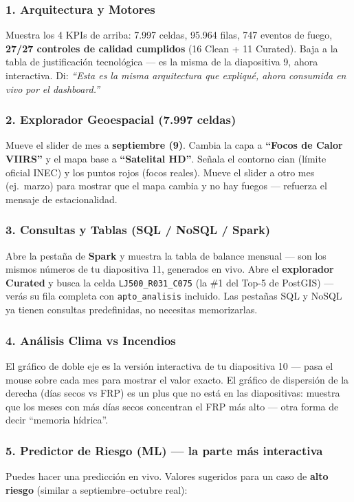 \documentclass[11pt,a4paper]{article}
\begin{document}
\subsubsection*{1. Arquitectura y Motores}
Muestra los 4 KPIs de arriba: 7.997 celdas, 95.964 filas, 747 eventos de fuego, \textbf{27/27 controles de calidad cumplidos} (16 Clean + 11 Curated). Baja a la tabla de justificaci\'on tecnol\'ogica --- es la misma de la diapositiva 9, ahora interactiva. Di: \emph{``Esta es la misma arquitectura que expliqu\'e, ahora consumida en vivo por el dashboard.''}

\subsubsection*{2. Explorador Geoespacial (7.997 celdas)}
Mueve el slider de mes a \textbf{septiembre (9)}. Cambia la capa a \textbf{``Focos de Calor VIIRS''} y el mapa base a \textbf{``Satelital HD''}. Se\~nala el contorno cian (l\'imite oficial INEC) y los puntos rojos (focos reales). Mueve el slider a otro mes (ej.\ marzo) para mostrar que el mapa cambia y no hay fuegos --- refuerza el mensaje de estacionalidad.

\subsubsection*{3. Consultas y Tablas (SQL / NoSQL / Spark)}
Abre la pesta\~na de \textbf{Spark} y muestra la tabla de balance mensual --- son los mismos n\'umeros de tu diapositiva 11, generados en vivo. Abre el \textbf{explorador Curated} y busca la celda \texttt{LJ500\_R031\_C075} (la \#1 del Top-5 de PostGIS) --- ver\'as su fila completa con \texttt{apto\_analisis} incluido. Las pesta\~nas SQL y NoSQL ya tienen consultas predefinidas, no necesitas memorizarlas.

\subsubsection*{4. An\'alisis Clima vs Incendios}
El gr\'afico de doble eje es la versi\'on interactiva de tu diapositiva 10 --- pasa el mouse sobre cada mes para mostrar el valor exacto. El gr\'afico de dispersi\'on de la derecha (d\'ias secos vs FRP) es un plus que no est\'a en las diapositivas: muestra que los meses con m\'as d\'ias secos concentran el FRP m\'as alto --- otra forma de decir ``memoria h\'idrica''.

\subsubsection*{5. Predictor de Riesgo (ML) --- la parte m\'as interactiva}
Puedes hacer una predicci\'on en vivo. Valores sugeridos para un caso de \textbf{alto riesgo} (similar a septiembre--octubre real):
\end{document}
